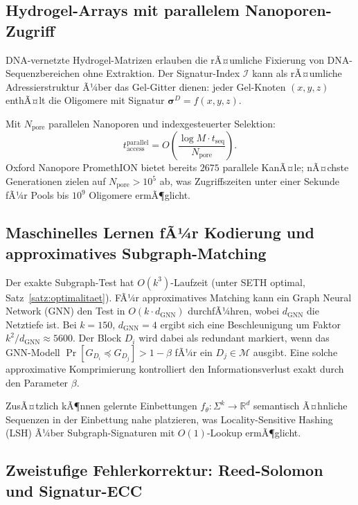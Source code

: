 ﻿\documentclass[a4paper,12pt]{article}
\theoremstyle{definition}
\theoremstyle{plain}
\begin{document}
\subsection{Hydrogel-Arrays mit parallelem Nanoporen-Zugriff}
\label{ssec:hydrogel}

DNA-vernetzte Hydrogel-Matrizen erlauben die rÃ¤umliche Fixierung von
DNA-Sequenz\-bereichen ohne Extraktion.  Der Signatur-Index $\mathcal{I}$
kann als rÃ¤umliche Adressierstruktur Ã¼ber das Gel-Gitter dienen: jeder
Gel-Knoten $(x,y,z)$ enthÃ¤lt die Oligomere mit Signatur
$\boldsymbol{\sigma}^D = f(x,y,z)$.

Mit $N_{\mathrm{pore}}$ parallelen Nanoporen und indexgesteuerter Selektion:
\[
  t_{\mathrm{access}}^{\mathrm{parallel}}
  = O\!\left(\frac{\log M \cdot t_{\mathrm{seq}}}{N_{\mathrm{pore}}}\right).
\]
Oxford Nanopore PromethION bietet bereits $2675$ parallele KanÃ¤le;
nÃ¤chste Generationen zielen auf $N_{\mathrm{pore}} > 10^5$ ab, was
Zugriffszeiten unter einer Sekunde fÃ¼r Pools bis $10^9$ Oligomere
ermÃ¶glicht.

\subsection{Maschinelles Lernen fÃ¼r Kodierung und approximatives Subgraph-Matching}
\label{ssec:ml}

Der exakte Subgraph-Test hat $O(k^3)$-Laufzeit (unter SETH optimal,
Satz~\ref{satz:optimalitaet}).  FÃ¼r approximatives Matching kann ein
Graph Neural Network (GNN) den Test in $O(k \cdot d_{\mathrm{GNN}})$
durchfÃ¼hren, wobei $d_{\mathrm{GNN}}$ die Netztiefe ist.  Bei
$k = 150$, $d_{\mathrm{GNN}} = 4$ ergibt sich eine Beschleunigung um
Faktor $k^2/d_{\mathrm{GNN}} \approx 5600$.  Der Block $D_i$ wird dabei
als redundant markiert, wenn das GNN-Modell
$\Pr[G_{D_i} \preceq G_{D_j}] > 1 - \beta$ fÃ¼r ein $D_j \in \mathcal{M}$
ausgibt.  Eine solche approximative Komprimierung kontrolliert den
Informationsverlust exakt durch den Parameter $\beta$.

ZusÃ¤tzlich kÃ¶nnen gelernte Einbettungen
$f_\theta: \Sigma^k \to \mathbb{R}^d$ semantisch Ã¤hnliche Sequenzen in der
Einbettung nahe platzieren, was Locality-Sensitive Hashing (LSH) Ã¼ber
Subgraph-Signaturen mit $O(1)$-Lookup ermÃ¶glicht.

\subsection{Zweistufige Fehlerkorrektur: Reed-Solomon und Signatur-ECC}
\label{ssec:zweistufen_ecc}
\end{document}
